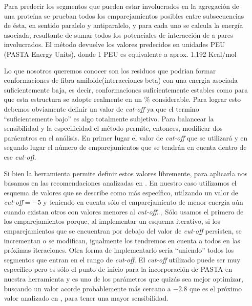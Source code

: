 Para predecir los segmentos que pueden estar involucrados en la agregación de una proteína
se prueban todos los emparejamientos posibles entre subsecuencias de ésta, en sentido paralelo y antiparalelo, y para cada uno 
se calcula la energía asociada, resultante de sumar todos los potenciales de interacción de a pares involucrados.
El método devuelve los valores predecidos en unidades PEU (PASTA Energy Units), donde 1 PEU es equivalente a aprox. 1,192 Kcal/mol 

Lo que nosotros queremos conocer son los residuos que podrian formar conformaciones de fibra amiloide(interacciones beta) con una energia asociada
suficientemente baja, es decir, conformaciones suficientemente estables como para que esta estructura se adopte realmente en un \% considerable.
Para lograr esto debemos obviamente definir un valor de \textit{cut-off} ya que el termino ``suficientemente bajo'' es algo totalmente subjetivo. 
Para balancear la sensibilidad y la especificidad el método permite, entonces, modificar dos paráemtros en el análisis. En primer lugar el valor de \textit{cut-off} que se utilizará y en segundo lugar el número de emparejamientos que 
se tendrán en cuenta dentro de ese \textit{cut-off}.

Si bien la herramienta permite definir estos valores libremente, para aplicarla nos basamos en las recomendaciones analizadas en \cite{walsh2014pasta}.
En nuestro caso utilizamos el esquema de valores que se describe como más específico, utilzando un valor de \textit{cut-off}$=-5$ y teniendo en cuenta sólo el emparejamiento de menor energía aún cuando existan otros con valores menores al \textit{cut-off}. , 
Sólo usamos el primero de los emparejamientos porque, al implementar un esquema iterativo, si los emparejamientos que se encuentran por debajo  del valor de \textit{cut-off} persisten, se incrementan o se modifican,
igualmente los tendremos en cuenta a todos en las próximas iteraciones. Otra forma de implementarlo sería ``uniendo'' todos los segmentos que entran en el rango de \textit{cut-off}.
El \textit{cut-off} utilizado puede ser muy específico pero es sólo el punto de inicio para la incorporación de PASTA en nuestra herramienta y es uno de los parámetros que quizás sea mejor optimizar, 
buscando un valor acorde probablemente más cercano a $-2.8$ que es el próximo valor analizado en \cite{walsh2014pasta}, para tener una mayor sensibilidad. 

